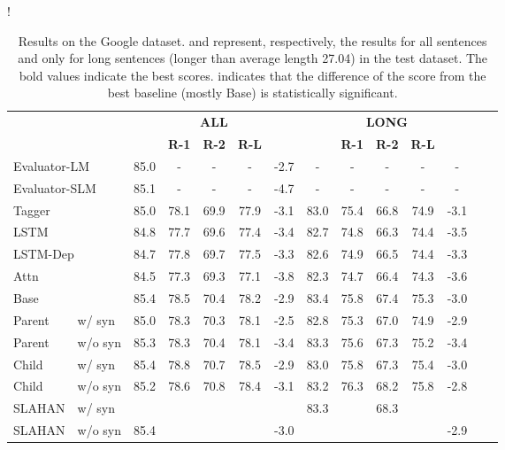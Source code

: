 \documentclass[letterpaper]{article} \usepackage{aaai20}  \usepackage{times}  \usepackage{helvet} \usepackage{courier}  \usepackage[hyphens]{url}  \usepackage{graphicx} \urlstyle{rm} \def\UrlFont{\rm}  \usepackage{graphicx}  \frenchspacing  \setlength{\pdfpagewidth}{8.5in}  \setlength{\pdfpageheight}{11in}  \usepackage{tabu}
\begin{document}
\begin{table*}[t]
\centering
\resizebox {0.8\textwidth} {!} {
\small
\begin{tabular}{llcccccccccccc}
\toprule
& & \multicolumn{5}{c}{\textbf{ALL}} & \multicolumn{5}{c}{\textbf{LONG}}
\\
\cmidrule(lr){3-7} \cmidrule(lr){8-12}
 & &  & \textbf{R-1} & \textbf{R-2} & \textbf{R-L} &  &  & \textbf{R-1} & \textbf{R-2} & \textbf{R-L} &  \\
\midrule
\multicolumn{2}{l}{Evaluator-LM \cite{zhao-etal-2018-language}}    & 85.0 & - & - & - & -2.7 & - & - & - & - & -\\
\multicolumn{2}{l}{Evaluator-SLM \cite{zhao-etal-2018-language}}    & 85.1 & - & - & - & -4.7 & - & - & - & - & -\\
\midrule
\multicolumn{2}{l}{Tagger}  & 85.0 & 78.1 & 69.9 & 77.9 & -3.1 & 83.0 & 75.4 & 66.8 & 74.9 & -3.1\\
\multicolumn{2}{l}{LSTM}    & 84.8 & 77.7 & 69.6 & 77.4 & -3.4 & 82.7 & 74.8 & 66.3 & 74.4 & -3.5\\
\multicolumn{2}{l}{LSTM-Dep}& 84.7 & 77.8 & 69.7 & 77.5 & -3.3 & 82.6 & 74.9 & 66.5 & 74.4 & -3.3\\
\multicolumn{2}{l}{Attn}    & 84.5 & 77.3 & 69.3 & 77.1 & -3.8 & 82.3 & 74.7 & 66.4 & 74.3 & -3.6\\
\multicolumn{2}{l}{Base}    & 85.4 & 78.5 & 70.4 & 78.2 & -2.9 & 83.4 & 75.8 & 67.4 & 75.3 & -3.0\\
Parent & w/ syn             & 85.0 & 78.3 & 70.3 & 78.1 & -2.5 & 82.8 & 75.3 & 67.0 & 74.9 & -2.9\\
Parent & w/o syn            & 85.3 & 78.3 & 70.4 & 78.1 & -3.4 & 83.3 & 75.6 & 67.3 & 75.2 & -3.4\\
\midrule
Child & w/ syn              & 85.4 & 78.8 & 70.7 & 78.5 & -2.9 & 83.0 & 75.8 & 67.3 & 75.4 & -3.0\\
Child & w/o syn             & 85.2 & 78.6 & 70.8 & 78.4 & -3.1 & 83.2 & 76.3 & 68.2 & 75.8 & -2.8\\
SLAHAN & w/ syn             &  &  &  &  &  & 83.3 &  & 68.3 &  & \\
SLAHAN & w/o syn            & 85.4 &  &  &  & -3.0 &  &  &  &  & -2.9\\
\bottomrule
\end{tabular}
}
    \caption{Results on the Google dataset.  and  represent, respectively, the results for all sentences and only for long sentences (longer than average length 27.04) in the test dataset. The bold values indicate the best scores.  indicates that the difference of the score from the best baseline (mostly Base) is statistically significant.\footnotemark[8]} \label{tb:eval:google}
\end{table*}
\end{document}
